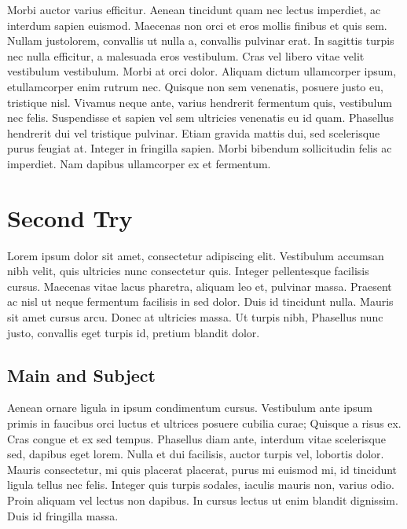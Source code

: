 \documentclass[12pt,a4paper]{book}
\begin{document}
Morbi auctor varius efficitur. Aenean tincidunt quam nec lectus imperdiet, ac interdum sapien euismod. Maecenas non orci et eros mollis finibus et quis sem. Nullam justo\pleasecite lorem, convallis ut nulla a, convallis pulvinar erat. In sagittis turpis nec nulla efficitur, a malesuada eros vestibulum. Cras vel libero vitae velit vestibulum vestibulum. Morbi at orci dolor. Aliquam dictum ullamcorper ipsum, et ullamcorper enim rutrum nec. Quisque non sem venenatis, posuere justo eu, tristique nisl. Vivamus neque ante, varius hendrerit fermentum quis, vestibulum nec felis. Suspendisse et sapien vel sem ultricies venenatis eu id quam. Phasellus hendrerit dui vel tristique pulvinar. Etiam gravida mattis dui, sed scelerisque purus feugiat at. Integer in fringilla sapien. Morbi bibendum sollicitudin felis ac imperdiet. Nam dapibus ullamcorper ex et fermentum.

\chapter{Second Try}



Lorem ipsum dolor sit amet, consectetur adipiscing elit. Vestibulum accumsan nibh velit, quis ultricies nunc consectetur quis. Integer pellentesque facilisis cursus. Maecenas vitae lacus pharetra, aliquam leo et, pulvinar massa. Praesent ac nisl ut neque fermentum facilisis in sed dolor. Duis id tincidunt nulla. Mauris sit amet cursus arcu. Donec at ultricies massa. Ut turpis nibh,  Phasellus nunc justo, convallis eget turpis id, pretium blandit dolor.

\section{Main and Subject}


 Aenean ornare ligula in ipsum condimentum cursus. Vestibulum ante ipsum primis in faucibus orci luctus et ultrices posuere cubilia curae; Quisque a risus ex. Cras congue et ex sed tempus. Phasellus diam ante, interdum vitae scelerisque sed, dapibus eget lorem. Nulla et dui facilisis, auctor turpis vel, lobortis dolor. Mauris consectetur, mi quis placerat placerat, purus mi euismod mi, id tincidunt ligula tellus nec felis. Integer quis turpis sodales, iaculis mauris non, varius odio. Proin aliquam vel lectus non dapibus. In cursus lectus ut enim blandit dignissim. Duis id fringilla massa.
\end{document}
